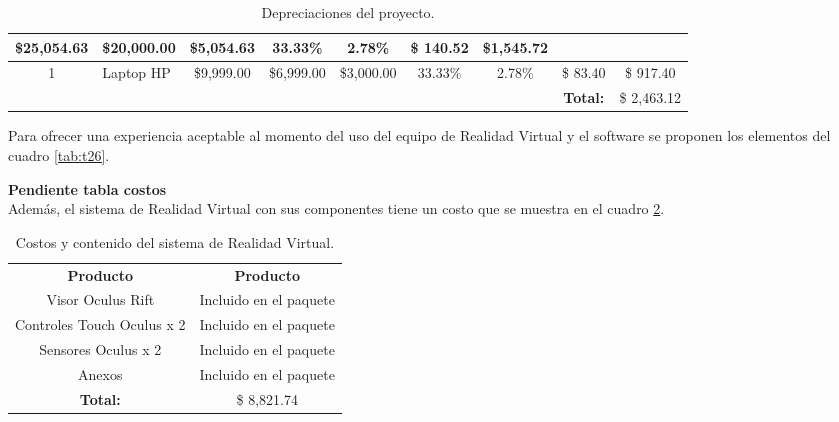 \begin{table}[H]
{\begin{tabular}{clccccc|c|c|}
  \multicolumn{1}{c|}{\$25,054.63} &
  \multicolumn{1}{c|}{\$20,000.00} &
  \multicolumn{1}{c|}{\$5,054.63} &
  \multicolumn{1}{c|}{33.33\%} &
  2.78\% &
  \$ 140.52 &
  \$1,545.72 \\ \hline
\multicolumn{1}{|c|}{\cellcolor[HTML]{C0C0C0}1} &
  \multicolumn{1}{l|}{Laptop HP} &
  \multicolumn{1}{c|}{\$9,999.00} &
  \multicolumn{1}{c|}{\$6,999.00} &
  \multicolumn{1}{c|}{\$3,000.00} &
  \multicolumn{1}{c|}{33.33\%} &
  2.78\% &
  \$ 83.40 &
  \$ 917.40 \\ \hline
\multicolumn{7}{l}{} &
  \textbf{Total:} &
  \$ 2,463.12 \\ \cline{8-9} 
\end{tabular}
}
\caption{Depreciaciones del proyecto.}
\label{tab:t25}
\end{table}

Para ofrecer una experiencia aceptable al momento del uso del equipo de Realidad Virtual y el software se proponen los elementos del cuadro \ref{tab:t26}.

\textbf{Pendiente tabla costos}\\

Además, el sistema de Realidad Virtual con sus componentes tiene un costo que se muestra en el cuadro \ref{tab:t27}.
\begin{table}[H]
  \centering
  \begin{tabular}{|c|c|}
  \hline
  \rowcolor[HTML]{9B9B9B} 
  \multicolumn{2}{|c|}{\cellcolor[HTML]{9B9B9B}\textbf{Sistema de Realidad Virtual}} \\ \hline
  \rowcolor[HTML]{9B9B9B} 
  \textbf{Producto}                          & \textbf{Producto}                     \\ \hline
  Visor Oculus Rift                          & Incluido en el paquete                \\ \hline
  Controles Touch Oculus x 2                 & Incluido en el paquete                \\ \hline
  Sensores Oculus x 2                        & Incluido en el paquete                \\ \hline
  Anexos                                     & Incluido en el paquete                \\ \hline
  \textbf{Total:}                            & \$ 8,821.74                           \\ \hline
  \end{tabular}
  \caption{Costos y contenido del sistema de Realidad Virtual.}
  \label{tab:t27}
\end{table}

